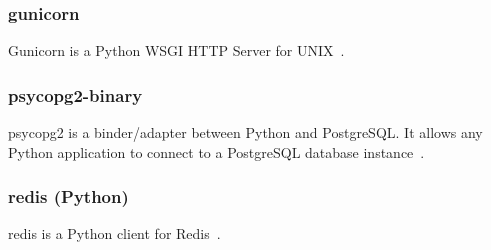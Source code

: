 \subsubsection{gunicorn}
Gunicorn is a Python WSGI HTTP Server for UNIX~\cite{gunicorn}.

\subsubsection{psycopg2-binary}
psycopg2 is a binder/adapter between Python and PostgreSQL\@. It allows any Python
application to connect to a PostgreSQL database instance~\cite{psycopg2}.

\subsubsection{redis (Python)}
redis is a Python client for Redis~\cite{python-redis}.

